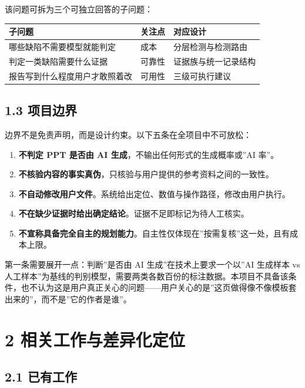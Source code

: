 \documentclass[
  11pt,
]{article}
\newcounter{none} %
\providecommand{\tightlist}{%
  \setlength{\itemsep}{0pt}\setlength{\parskip}{0pt}}
\begin{document}
该问题可拆为三个可独立回答的子问题：

{\def\LTcaptype{none} %
\begin{longtable}[]{@{}lll@{}}
\toprule\noalign{}
子问题 & 关注点 & 对应设计 \\
\midrule\noalign{}
\endhead
\bottomrule\noalign{}
\endlastfoot
哪些缺陷不需要模型就能判定 & 成本 & 分层检测与检测路由 \\
判定一类缺陷需要什么证据 & 可靠性 & 证据族与统一记录结构 \\
报告写到什么程度用户才敢照着改 & 可用性 & 三级可执行建议 \\
\end{longtable}
}

\subsection{1.3 项目边界}\label{ux9879ux76eeux8fb9ux754c}

边界不是免责声明，而是设计约束。以下五条在全项目中不可放松：

\begin{enumerate}
\def\labelenumi{\arabic{enumi}.}
\tightlist
\item
  \textbf{不判定 PPT 是否由 AI 生成}，不输出任何形式的生成概率或''AI
  率''。
\item
  \textbf{不核验内容的事实真伪}，只核验与用户提供的参考资料之间的一致性。
\item
  \textbf{不自动修改用户文件}。系统给出定位、数值与操作路径，修改由用户执行。
\item
  \textbf{不在缺少证据时给出确定结论}。证据不足即标记为待人工核实。
\item
  \textbf{不宣称具备完全自主的规划能力}。自主性仅体现在''按需复核''这一处，且有成本上限。
\end{enumerate}

第一条需要展开一点：判断''是否由 AI 生成''在技术上要求一个以''AI
生成样本 vs
人工样本''为基线的判别模型，需要两类各数百份的标注数据。本项目不具备该条件，也不认为这是用户真正关心的问题------用户关心的是''这页做得像不像模板套出来的''，而不是''它的作者是谁''。

\section{2
相关工作与差异化定位}\label{ux76f8ux5173ux5de5ux4f5cux4e0eux5deeux5f02ux5316ux5b9aux4f4d}

\subsection{2.1 已有工作}\label{ux5df2ux6709ux5de5ux4f5c}
\end{document}

